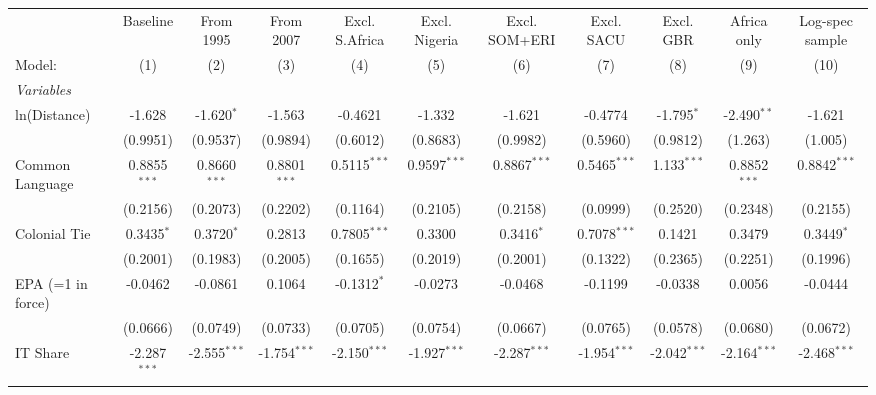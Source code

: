 
\begingroup
\centering
\begin{tabular}{lcccccccccc}
   \tabularnewline \midrule \midrule
                             & Baseline       & From 1995      & From 2007      & Excl. S.Africa & Excl. Nigeria  & Excl. SOM+ERI  & Excl. SACU     & Excl. GBR      & Africa only    & Log-spec sample \\   
   Model:                    & (1)            & (2)            & (3)            & (4)            & (5)            & (6)            & (7)            & (8)            & (9)            & (10)\\  
   \midrule
   \emph{Variables}\\
   ln(Distance)              & -1.628         & -1.620$^{*}$   & -1.563         & -0.4621        & -1.332         & -1.621         & -0.4774        & -1.795$^{*}$   & -2.490$^{**}$  & -1.621\\   
                             & (0.9951)       & (0.9537)       & (0.9894)       & (0.6012)       & (0.8683)       & (0.9982)       & (0.5960)       & (0.9812)       & (1.263)        & (1.005)\\   
   Common Language           & 0.8855$^{***}$ & 0.8660$^{***}$ & 0.8801$^{***}$ & 0.5115$^{***}$ & 0.9597$^{***}$ & 0.8867$^{***}$ & 0.5465$^{***}$ & 1.133$^{***}$  & 0.8852$^{***}$ & 0.8842$^{***}$\\   
                             & (0.2156)       & (0.2073)       & (0.2202)       & (0.1164)       & (0.2105)       & (0.2158)       & (0.0999)       & (0.2520)       & (0.2348)       & (0.2155)\\   
   Colonial Tie              & 0.3435$^{*}$   & 0.3720$^{*}$   & 0.2813         & 0.7805$^{***}$ & 0.3300         & 0.3416$^{*}$   & 0.7078$^{***}$ & 0.1421         & 0.3479         & 0.3449$^{*}$\\   
                             & (0.2001)       & (0.1983)       & (0.2005)       & (0.1655)       & (0.2019)       & (0.2001)       & (0.1322)       & (0.2365)       & (0.2251)       & (0.1996)\\   
   EPA (=1 in force)         & -0.0462        & -0.0861        & 0.1064         & -0.1312$^{*}$  & -0.0273        & -0.0468        & -0.1199        & -0.0338        & 0.0056         & -0.0444\\   
                             & (0.0666)       & (0.0749)       & (0.0733)       & (0.0705)       & (0.0754)       & (0.0667)       & (0.0765)       & (0.0578)       & (0.0680)       & (0.0672)\\   
   IT Share                  & -2.287$^{***}$ & -2.555$^{***}$ & -1.754$^{***}$ & -2.150$^{***}$ & -1.927$^{***}$ & -2.287$^{***}$ & -1.954$^{***}$ & -2.042$^{***}$ & -2.164$^{***}$ & -2.468$^{***}$\\   

\end{tabular}
